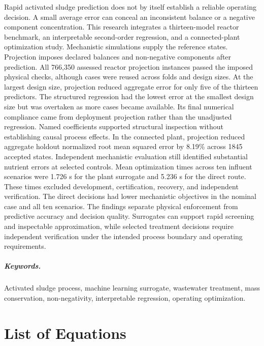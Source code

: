 \documentclass[12pt,twoside]{book}
\makeatletter
\newcommand{\listofequations}{%
    \chapter*{List of Equations}%
    \addcontentsline{toc}{chapter}{List of Equations}%
    \@starttoc{loe}%
}
\makeatother
\begin{document}
Rapid activated sludge prediction does not by itself establish a reliable operating decision. A small average error can conceal an inconsistent balance or a negative component concentration. This research integrates a thirteen-model reactor benchmark, an interpretable second-order regression, and a connected-plant optimization study. Mechanistic simulations supply the reference states. Projection imposes declared balances and non-negative components after prediction. All 766,350 assessed reactor projection instances passed the imposed physical checks, although cases were reused across folds and design sizes. At the largest design size, projection reduced aggregate error for only five of the thirteen predictors. The structured regression had the lowest error at the smallest design size but was overtaken as more cases became available. Its final numerical compliance came from deployment projection rather than the unadjusted regression. Named coefficients supported structural inspection without establishing causal process effects. In the connected plant, projection reduced aggregate holdout normalized root mean squared error by 8.19\% across 1845 accepted states. Independent mechanistic evaluation still identified substantial nutrient errors at selected controls. Mean optimization times across ten influent scenarios were 1.726 s for the plant surrogate and 5.236 s for the direct route. These times excluded development, certification, recovery, and independent verification. The direct decisions had lower mechanistic objectives in the nominal case and all ten scenarios. The findings separate physical enforcement from predictive accuracy and decision quality. Surrogates can support rapid screening and inspectable approximation, while selected treatment decisions require independent verification under the intended process boundary and operating requirements.

\paragraph*{Keywords.} Activated sludge process, machine learning surrogate, wastewater treatment, mass conservation, non-negativity, interpretable regression, operating optimization.

\cleardoublepage
\tableofcontents
\cleardoublepage
\listoffigures
\cleardoublepage
\listoftables

\cleardoublepage
\listofequations

\cleardoublepage
\end{document}
